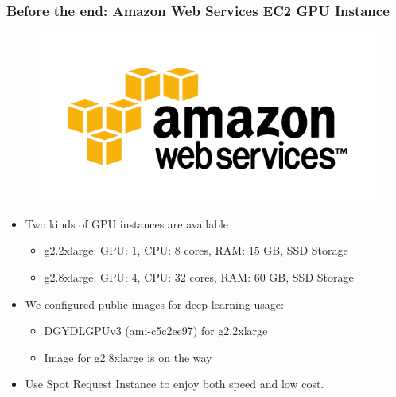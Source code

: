 \documentclass{beamer}
\begin{document}
\begin{frame}
\frametitle{Before the end: Amazon Web Services EC2 GPU Instance}

\begin{minipage}{0.3\textwidth}
  \begin{figure}
    \includegraphics[width=\textwidth]{aws_logo.png}
  \end{figure}
\end{minipage}
\begin{minipage}{0.6\textwidth}
\begin{itemize}
\item[\ding{71}] Two kinds of GPU instances are available
  \begin{itemize}
    \item[\ding{246}] g2.2xlarge: GPU: 1, CPU: 8 cores, RAM: 15 GB, SSD Storage
    \item[\ding{246}] g2.8xlarge: GPU: 4, CPU: 32 cores, RAM: 60 GB, SSD Storage
  \end{itemize}
\item[\ding{71}] We configured public images for deep learning usage:
  \begin{itemize}
    \item[\ding{246}] DGYDLGPUv3 (ami-c5c2ee97) for g2.2xlarge
    \item[\ding{246}] Image for g2.8xlarge is on the way
  \end{itemize}
\item[\ding{71}] Use Spot Request Instance to enjoy both speed and low cost.
\end{itemize}
\end{minipage}

\end{frame}
\end{document}
